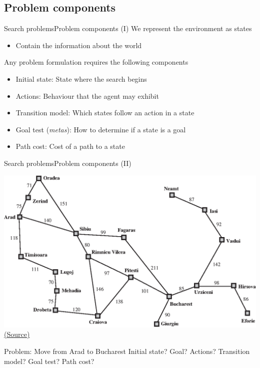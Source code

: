 \documentclass[10pt,compress]{beamer} %
\begin{document}
\subsection{Problem components}
\begin{frame}{Search problems}{Problem components (I)}
    We represent the environment as \alert{states}
        \begin{itemize}
            \item Contain the information about the world
        \end{itemize}
    Any problem formulation requires the following components
	\begin{itemize}
        \item Initial state: State where the search begins
        \item Actions: Behaviour that the agent may exhibit
        \item Transition model: Which states follow an action in a state
        \item Goal test (\textit{metas}): How to determine if a state is a goal
        \item Path cost: Cost of a path to a state
	\end{itemize}
\end{frame}

\begin{frame}{Search problems}{Problem components (II)}
    \begin{center}
	    \includegraphics[width=0.7\linewidth]{figs/romania-distances.eps}\\
	    \tiny{\href{http://aima.cs.berkeley.edu/index.html}{(Source)}}
	\end{center}
    \begin{exampleblock}{Problem: Move from Arad to Bucharest}
        Initial state? Goal? Actions? Transition model? Goal test? Path cost?
    \end{exampleblock}
\end{frame}
\end{document}
